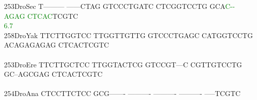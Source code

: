 \documentclass[11pt,twoside,reqno,a4paper]{article}
\begin{document}
{253\hspace*{1\charwidth}DroSec	T---------	------CTAG	GTCCCTGATC	CTCGGTCCTG	GCA\textcolor{Green}{C}\textcolor{Green}{-}\textcolor{Green}{-}\textcolor{Green}{A}\textcolor{Green}{G}\textcolor{Green}{A}\textcolor{Green}{G}	\textcolor{Green}{C}\textcolor{Green}{T}\textcolor{Green}{C}\textcolor{Green}{A}\textcolor{Green}{C}TCGTC	\\
\hspace*{4\charwidth}\hspace*{7\charwidth}\hspace*{1\charwidth}\hspace*{1\charwidth}\hspace*{1\charwidth}\hspace*{1\charwidth}\hspace*{43\charwidth}\textcolor{Green}{6.7}\hspace*{1\charwidth}\hspace*{1\charwidth}\\
258\hspace*{1\charwidth}DroYak	TTCTTGGTCC	TTGGTTGTTG	GTCCCTGAGC	CATGGTCCTG	ACAGAGAGAG	CTCACTCGTC	\\
\hspace*{4\charwidth}\hspace*{7\charwidth}\hspace*{1\charwidth}\hspace*{1\charwidth}\hspace*{1\charwidth}\hspace*{1\charwidth}\hspace*{1\charwidth}\hspace*{1\charwidth}\\
253\hspace*{1\charwidth}DroEre	TTCTTGCTCC	TTGGTACTCG	GTCCGT---C	CGTTGTCCTG	GC--AGCGAG	CTCACTCGTC	\\
\hspace*{4\charwidth}\hspace*{7\charwidth}\hspace*{1\charwidth}\hspace*{1\charwidth}\hspace*{1\charwidth}\hspace*{1\charwidth}\hspace*{1\charwidth}\hspace*{1\charwidth}\\
254\hspace*{1\charwidth}DroAna	CTCCTTCTCC	GCG-------	----------	----------	----------	-----TCGTC	\\
}
\end{document}
